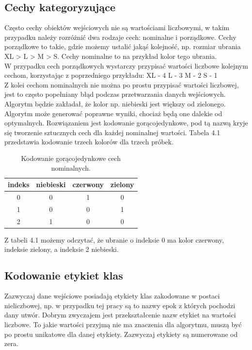 \documentclass[printmode, eng]{mgr}
\newcommand\tab[1][1cm]{\hspace*{#1}}
\begin{document}
\subsection{Cechy kategoryzujące}
\tab Często cechy obiektów wejściowych nie są wartościami liczbowymi, w takim przypadku należy rozróżnić dwa rodzaje cech: nominalne i porządkowe. Cechy porządkowe to takie, gdzie możemy ustalić jakąś kolejność, np. rozmiar ubrania XL > L > M > S. Cechy nominalne to na przykład kolor tego ubrania.\\
\tab W przypadku cech porządkowych wystarczy przypisać wartości liczbowe kolejnym cechom, korzystając z poprzedniego przykładu:
XL - 4
L - 3
M - 2
S - 1\\
\tab Z kolei cechom nominalnych nie można po prostu przypisać wartości liczbowej, jest to często popełniany błąd podczas przetwarzania danych wejściowych. Algorytm będzie zakładał, że kolor np. niebieski jest większy od zielonego. Algorytm może generować poprawne wyniki, chociaż będą one dalekie od optymalnych. Rozwiązaniem jest kodowanie gorącojedynkowe, pod tą nazwą kryje się tworzenie sztucznych cech dla każdej nominalnej wartości. Tabela 4.1 przedstawia kodowanie trzech kolorów dla trzech próbek.
\begin{table}[H]
\centering
\caption{Kodowanie gorącojedynkowe cech nominalnych.}
\begin{tabular}{c|c|c|c}

indeks & niebieski & czerwony & zielony \\
\hline
0 & 0 & 1 & 0 \\
\hline
1 & 0 & 0 & 1 \\
\hline
2 & 1 & 0 & 0 \\

\end{tabular}
\end{table}
Z tabeli 4.1 możemy odczytać, że ubranie o indeksie 0 ma kolor czerwony, indeksie zielony, a indeksie 2 niebieski.
\subsection{Kodowanie etykiet klas}
\tab Zazwyczaj dane wejściowe posiadają etykiety klas zakodowane w postaci nieliczbowej, np. w przypadku tej pracy są to nazwy epok z których pochodzi dany utwór. Dobrym zwyczajem jest przekształcenie nazw etykiet na wartości liczbowe. To jakie wartości przyjmą nie ma znaczenia dla algorytmu, muszą być po prostu unikatowe dla danej etykiety. Zazwyczaj etykiety są numerowane od zera. 
\end{document}
